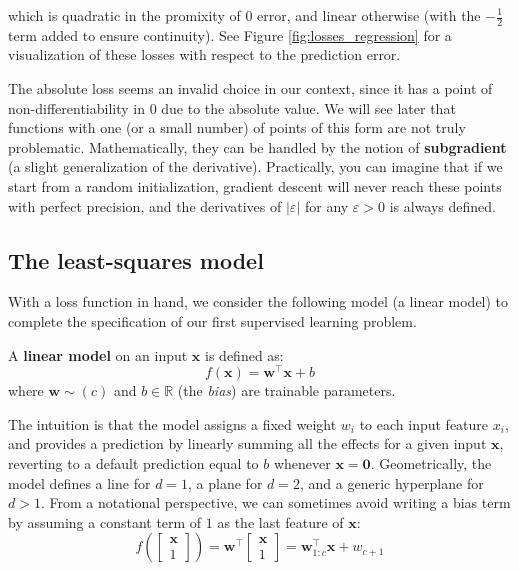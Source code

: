 which is quadratic in the promixity of $0$ error, and linear otherwise (with the $-\frac{1}{2}$ term added to ensure continuity). See Figure \ref{fig:losses_regression} for a visualization of these losses with respect to the prediction error. 

The absolute loss seems an invalid choice in our context, since it has a point of non-differentiability in $0$ due to the absolute value. We will see later that functions with one (or a small number) of points of this form are not truly problematic. Mathematically, they can be handled by the notion of \textbf{subgradient} (a slight generalization of the derivative). Practically, you can imagine that if we start from a random initialization, gradient descent will never reach these points with perfect precision, and the derivatives of $\lvert \varepsilon \rvert$ for any $\varepsilon > 0$ is always defined.

\subsection{The least-squares model}
\label{subsec:least_squares}

\addclock With a loss function in hand, we consider the following model (a linear model) to complete the specification of our first supervised learning problem.
%
\begin{definition} 
A \textbf{linear model} on an input $\mathbf{x}$ is defined as:
%
$$
f(\mathbf{x})=\mathbf{w}^\top\mathbf{x} + b
$$
%
where $\mathbf{w} \sim (c)$ and $b \in \mathbb{R}$ (the \textit{bias}) are trainable parameters.
\end{definition}

The intuition is that the model assigns a fixed weight $w_i$ to each input feature $x_i$, and provides a prediction by linearly summing all the effects for a given input $\mathbf{x}$, reverting to a default prediction equal to $b$ whenever $\mathbf{x} = \mathbf{0}$. Geometrically, the model defines a line for $d=1$, a plane for $d=2$, and a generic hyperplane for $d > 1$. From a notational perspective, we can sometimes avoid writing  a bias term by assuming a constant term of $1$ as the last feature of $\mathbf{x}$:
%
$$
f\left(\begin{bmatrix}\mathbf{x}\\1\end{bmatrix}\right) = \mathbf{w}^\top\begin{bmatrix}\mathbf{x}\\1\end{bmatrix} = \mathbf{w}_{1:c}^\top\mathbf{x}+w_{c+1}
$$

